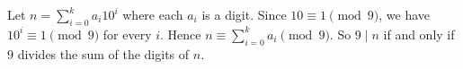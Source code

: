 Let $n = \sum_{i=0}^{k} a_{i}10^{i}$ where each $a_{i}$ is a digit.
Since $10 \equiv 1 \pmod{9}$, we have $10^{i} \equiv 1 \pmod{9}$ for every $i$.
Hence $n \equiv \sum_{i=0}^{k} a_{i} \pmod{9}$.
So $9 \mid n$ if and only if $9$ divides the sum of the digits of $n$.